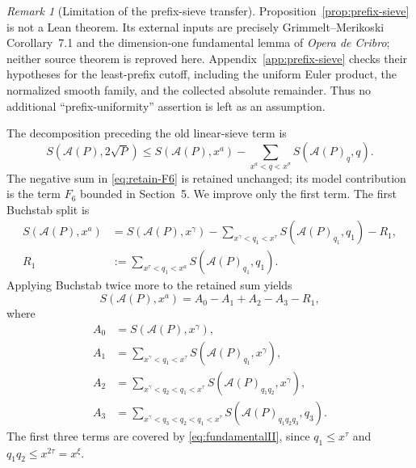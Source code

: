 \documentclass[10pt,reqno]{amsart}
\newcommand{\Acal}{\mathcal{A}}
\newcommand{\1}{\mathbf{1}}
\theoremstyle{plain}
\theoremstyle{remark}
\newtheorem{remark}[theorem]{Remark}
\begin{document}
\begin{remark}[Limitation of the prefix-sieve transfer]
\label{rem:prefix-sieve-limit}
Proposition~\ref{prop:prefix-sieve} is not a Lean theorem.  Its external
inputs are precisely Grimmelt--Merikoski Corollary~7.1 and the
dimension-one fundamental lemma of \emph{Opera de Cribro}; neither source
theorem is reproved here.  Appendix~\ref{app:prefix-sieve} checks their
hypotheses for the least-prefix cutoff, including the uniform Euler product,
the normalized smooth family, and the collected absolute remainder.  Thus
no additional ``prefix-uniformity'' assertion is left as an assumption.
\end{remark}

The decomposition preceding the old linear-sieve term is
\begin{equation}\label{eq:retain-F6}
 S(\Acal(P),2\sqrt P)
 \le S(\Acal(P),x^a)
 -\sum_{x^a<q<x^\sigma}S(\Acal(P)_q,q).
\end{equation}
The negative sum in \eqref{eq:retain-F6} is retained unchanged; its model
contribution is the term $F_6$ bounded in Section~5.  We improve only the
first term.  The first Buchstab split is
\begin{equation}\label{eq:first-switch}
 \begin{aligned}
  S(\Acal(P),x^a)
  &=S(\Acal(P),x^\gamma)
   -\sum_{x^\gamma<q_1<x^\tau}S(\Acal(P)_{q_1},q_1)-R_1,\\
  R_1&:=\sum_{x^\tau<q_1<x^a}S(\Acal(P)_{q_1},q_1).
 \end{aligned}
\end{equation}
Applying Buchstab twice more to the retained sum yields
\begin{equation}\label{eq:four-terms}
  S(\Acal(P),x^a)=A_0-A_1+A_2-A_3-R_1,
\end{equation}
where
\begin{align*}
 A_0&=S(\Acal(P),x^\gamma),\\
 A_1&=\sum_{x^\gamma<q_1<x^\tau}
       S(\Acal(P)_{q_1},x^\gamma),\\
 A_2&=\sum_{x^\gamma<q_2<q_1<x^\tau}
       S(\Acal(P)_{q_1q_2},x^\gamma),\\
 A_3&=\sum_{x^\gamma<q_3<q_2<q_1<x^\tau}
       S(\Acal(P)_{q_1q_2q_3},q_3).
\end{align*}
The first three terms are covered by \eqref{eq:fundamentalII}, since
$q_1\le x^\tau$ and $q_1q_2\le x^{2\tau}=x^\xi$.
\end{document}
